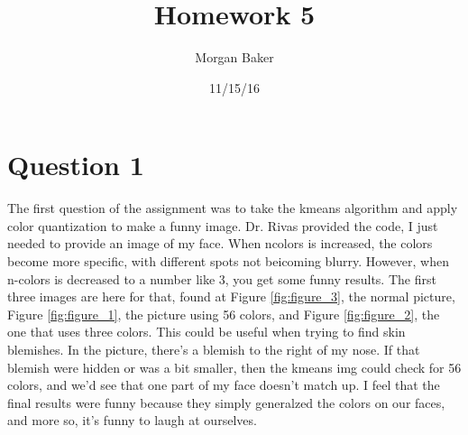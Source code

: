 \documentclass[a4paper]{article}
\title{Homework 5}
\author{Morgan Baker}
\date{11/15/16}
\begin{document}
\lstset{language=Python}

\maketitle

\section{Question 1}
The first question of the assignment was to take the kmeans algorithm and apply color quantization to make a funny image. Dr. Rivas provided the code, I just needed to provide an image of my face. When ncolors is increased, the colors become more specific, with different spots not beicoming blurry. However, when n-colors is decreased to a number like 3, you get some funny results. The first three images are here for that, found at Figure  \ref{fig:figure_3}, the normal picture, Figure \ref{fig:figure_1}, the picture using 56 colors, and Figure \ref{fig:figure_2}, the one that uses three colors. This could be useful when trying to find skin blemishes. In the picture, there's a blemish to the right of my nose. If that blemish were hidden or was a bit smaller, then the kmeans img could check for 56 colors, and we'd see that one part of my face doesn't match up. I feel that the final results were funny because they simply generalzed the colors on our faces, and more so, it's funny to laugh at ourselves. 
\end{document}
